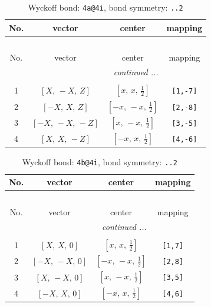 \documentclass[fleqn,8pt]{jsarticle}
\begin{document}
\begin{longtable}{cccc}
\caption{Wyckoff bond: {\tt 4a@4i}, bond symmetry: {\tt ..2}}
 \\
 \hline \hline
No. & vector & center & mapping \\ \hline \endfirsthead

\multicolumn{3}{l}{\tablename\ \thetable{}} \\
 \hline \hline
No. & vector & center & mapping \\ \hline \endhead

 \hline \hline
\multicolumn{3}{r}{\footnotesize\it continued ...} \\ \endfoot

 \hline \hline
\multicolumn{3}{r}{} \\ \endlastfoot

1 & $\left[ X,\, - X,\, Z \right]$ & $\left[ x,\, x,\, \frac{1}{2} \right]$ & {\tt [1,-7]} \\ \hline
2 & $\left[ - X,\, X,\, Z \right]$ & $\left[ - x,\, - x,\, \frac{1}{2} \right]$ & {\tt [2,-8]} \\ \hline
3 & $\left[ - X,\, - X,\, - Z \right]$ & $\left[ x,\, - x,\, \frac{1}{2} \right]$ & {\tt [3,-5]} \\ \hline
4 & $\left[ X,\, X,\, - Z \right]$ & $\left[ - x,\, x,\, \frac{1}{2} \right]$ & {\tt [4,-6]} \\
\end{longtable}
\renewcommand{\arraystretch}{1.2}
\begin{longtable}{cccc}
\caption{Wyckoff bond: {\tt 4b@4i}, bond symmetry: {\tt ..2}}
 \\
 \hline \hline
No. & vector & center & mapping \\ \hline \endfirsthead

\multicolumn{3}{l}{\tablename\ \thetable{}} \\
 \hline \hline
No. & vector & center & mapping \\ \hline \endhead

 \hline \hline
\multicolumn{3}{r}{\footnotesize\it continued ...} \\ \endfoot

 \hline \hline
\multicolumn{3}{r}{} \\ \endlastfoot

1 & $\left[ X,\, X,\, 0 \right]$ & $\left[ x,\, x,\, \frac{1}{2} \right]$ & {\tt [1,7]} \\ \hline
2 & $\left[ - X,\, - X,\, 0 \right]$ & $\left[ - x,\, - x,\, \frac{1}{2} \right]$ & {\tt [2,8]} \\ \hline
3 & $\left[ X,\, - X,\, 0 \right]$ & $\left[ x,\, - x,\, \frac{1}{2} \right]$ & {\tt [3,5]} \\ \hline
4 & $\left[ - X,\, X,\, 0 \right]$ & $\left[ - x,\, x,\, \frac{1}{2} \right]$ & {\tt [4,6]} \\
\end{longtable}
\end{document}
